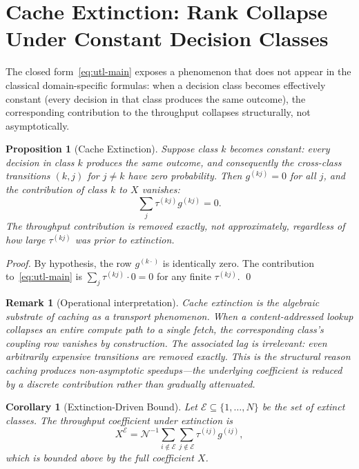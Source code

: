 \documentclass[twocolumn,11pt,a4paper]{article}
\newtheorem{corollary}[theorem]{Corollary}
\newtheorem{proposition}[theorem]{Proposition}
\newtheorem{remark}[theorem]{Remark}
\newcommand{\TP}{X}
\newcommand{\Norm}{\mathcal{N}}
\newcommand{\lag}{\tau}
\newcommand{\cpl}{g}
\newcommand{\classcount}{N}
\begin{document}
\section{Cache Extinction: Rank Collapse Under Constant Decision Classes}
\label{sec:cache}

The closed form~\eqref{eq:utl-main} exposes a phenomenon that does not appear in the classical domain-specific formulas: when a decision class becomes effectively constant (every decision in that class produces the same outcome), the corresponding contribution to the throughput collapses structurally, not asymptotically.

\begin{proposition}[Cache Extinction]
\label{prop:cache-extinction}
Suppose class $k$ becomes constant: every decision in class $k$ produces the same outcome, and consequently the cross-class transitions $(k, j)$ for $j \neq k$ have zero probability. Then $\cpl^{(kj)} = 0$ for all $j$, and the contribution of class $k$ to $\TP$ vanishes:
\[
\sum_j \lag^{(kj)} \cpl^{(kj)} = 0.
\]
The throughput contribution is removed exactly, not approximately, regardless of how large $\lag^{(kj)}$ was prior to extinction.
\end{proposition}

\begin{proof}
By hypothesis, the row $\cpl^{(k\cdot)}$ is identically zero. The contribution to~\eqref{eq:utl-main} is $\sum_j \lag^{(kj)} \cdot 0 = 0$ for any finite $\lag^{(kj)}$. \qed
\end{proof}

\begin{remark}[Operational interpretation]
Cache extinction is the algebraic substrate of caching as a transport phenomenon. When a content-addressed lookup collapses an entire compute path to a single fetch, the corresponding class's coupling row vanishes by construction. The associated lag is irrelevant: even arbitrarily expensive transitions are removed exactly. This is the structural reason caching produces non-asymptotic speedups---the underlying coefficient is reduced by a discrete contribution rather than gradually attenuated.
\end{remark}

\begin{corollary}[Extinction-Driven Bound]
\label{cor:extinction-bound}
Let $\mathcal{E} \subseteq \{1, \ldots, \classcount\}$ be the set of extinct classes. The throughput coefficient under extinction is
\[
\TP^{\mathcal{E}} = \Norm^{-1} \sum_{i \notin \mathcal{E}} \sum_{j \notin \mathcal{E}} \lag^{(ij)} \cpl^{(ij)},
\]
which is bounded above by the full coefficient $\TP$.
\end{corollary}
\end{document}
